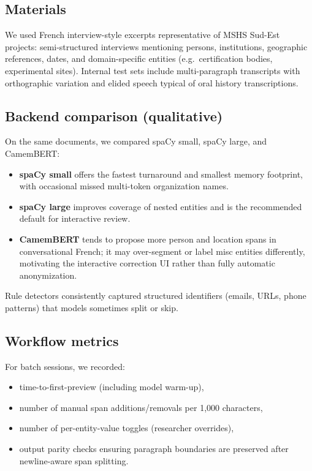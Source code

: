 \documentclass[11pt,a4paper]{article}
\begin{document}
\subsection{Materials}

We used French interview-style excerpts representative of MSHS Sud-Est projects:
semi-structured interviews mentioning persons, institutions, geographic references,
dates, and domain-specific entities (e.g.\ certification bodies, experimental sites).
Internal test sets include multi-paragraph transcripts with orthographic variation
and elided speech typical of oral history transcriptions.

\subsection{Backend comparison (qualitative)}

On the same documents, we compared spaCy small, spaCy large, and CamemBERT:
\begin{itemize}
  \item \textbf{spaCy small} offers the fastest turnaround and smallest memory
        footprint, with occasional missed multi-token organization names.
  \item \textbf{spaCy large} improves coverage of nested entities and is the
        recommended default for interactive review.
  \item \textbf{CamemBERT} tends to propose more person and location spans in
        conversational French; it may over-segment or label misc entities differently,
        motivating the interactive correction UI rather than fully automatic
        anonymization.
\end{itemize}

Rule detectors consistently captured structured identifiers (emails, URLs, phone
patterns) that models sometimes split or skip.

\subsection{Workflow metrics}

For batch sessions, we recorded:
\begin{itemize}[noitemsep]
  \item time-to-first-preview (including model warm-up),
  \item number of manual span additions/removals per 1{,}000 characters,
  \item number of per-entity-value toggles (researcher overrides),
  \item output parity checks ensuring paragraph boundaries are preserved after
        newline-aware span splitting.
\end{itemize}
\end{document}
